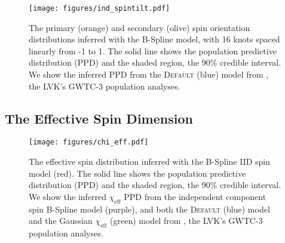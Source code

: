 \begin{figure}
    \begin{centering}
        \texttt{[image: figures/ind\_spintilt.pdf]}
        \caption{The primary (orange) and secondary (olive) spin orientation distributions inferred with the B-Spline model, 
        with 16 knots spaced linearly from -1 to 1. The solid line shows the population predictive distribution (PPD) and the shaded region, the 90\% credible interval. 
        We show the inferred PPD from the \textsc{Default} (blue) model from \citet{o3b_astro_dist}, the LVK's GWTC-3 population analyses.}
        \label{fig:ind_spintilt_dist}
    \end{centering}
\end{figure}

\subsection{The Effective Spin Dimension}

\begin{figure} 
    \begin{centering}
        \texttt{[image: figures/chi\_eff.pdf]}
        \caption{The effective spin distribution inferred with the B-Spline IID spin model (red). The solid line shows the population predictive 
        distribution (PPD) and the shaded region, the 90\% credible interval. We show the inferred $\chi_\mathrm{eff}$ 
        PPD from the independent component spin B-Spline model (purple), and both the \textsc{Default} (blue) model and the 
        Gaussian $\chi_\mathrm{eff}$ (green) model from \citet{o3b_astro_dist}, the LVK's GWTC-3 population analyses.}
        \label{fig:chieff_dist}
    \end{centering}
\end{figure}


